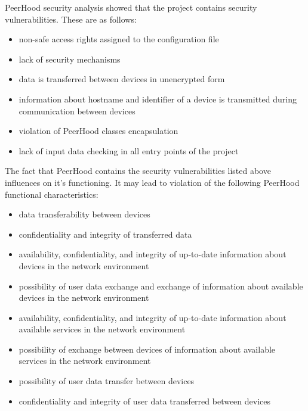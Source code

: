 %
PeerHood security analysis showed that the project contains security vulnerabilities. 
%
These are as follows:
\begin{itemize}
	\setlength{\itemsep}{0pt}%

	\item non-safe access rights assigned to the configuration file
	\item lack of security mechanisms
	\item data is transferred between devices in unencrypted form
	\item information about hostname and identifier of a device is transmitted during communication between devices
	\item violation of PeerHood  classes encapsulation
	\item lack of input data checking in all entry points of the project
\end{itemize}

%
The fact that PeerHood contains the security vulnerabilities listed above influences on it's functioning. 
%
It may lead to violation of the following PeerHood functional characteristics: 
\begin{itemize}
	\setlength{\itemsep}{0pt}%

	\item data transferability between devices
	\item confidentiality and integrity of transferred data

	\item availability, confidentiality, and integrity of up-to-date information about devices in the network environment
	\item possibility of user data exchange and exchange of information about available devices in the network environment

	\item availability, confidentiality, and integrity of up-to-date information about available services in the network environment
	\item possibility of exchange between devices of information about available services in the network environment

	\item possibility of user data transfer between devices
	\item confidentiality and integrity of user data transferred between devices
\end{itemize}

